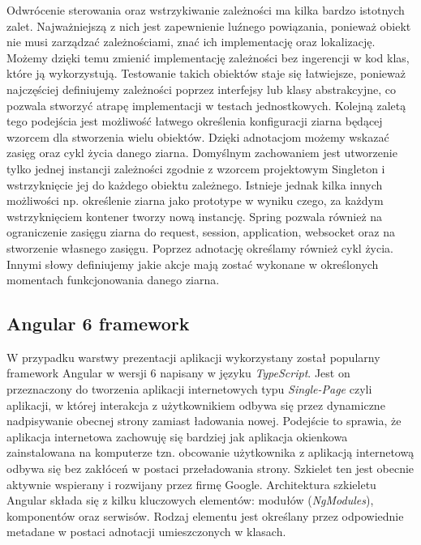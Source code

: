 Odwrócenie sterowania oraz wstrzykiwanie zależności ma kilka bardzo istotnych zalet. Najważniejszą z nich jest zapewnienie luźnego powiązania, ponieważ obiekt nie musi zarządzać zależnościami, znać ich implementację oraz lokalizację. Możemy dzięki temu zmienić implementację zależności bez ingerencji w kod klas, które ją wykorzystują. Testowanie takich obiektów staje się łatwiejsze, ponieważ najczęściej definiujemy zależności poprzez interfejsy lub klasy abstrakcyjne, co pozwala stworzyć atrapę implementacji w testach jednostkowych. Kolejną zaletą tego podejścia jest możliwość łatwego określenia konfiguracji ziarna będącej wzorcem dla stworzenia wielu obiektów. Dzięki adnotacjom możemy wskazać zasięg oraz cykl życia danego ziarna. Domyślnym zachowaniem jest utworzenie tylko jednej instancji zależności zgodnie z wzorcem projektowym Singleton i wstrzyknięcie jej do każdego obiektu zależnego. Istnieje jednak kilka innych możliwości np. określenie ziarna jako prototype w wyniku czego, za każdym wstrzyknięciem kontener tworzy nową instancję. Spring pozwala również na ograniczenie zasięgu ziarna do request, session, application, websocket oraz na stworzenie własnego zasięgu. Poprzez adnotację określamy również cykl życia. Innymi słowy definiujemy jakie akcje mają zostać wykonane w określonych momentach funkcjonowania danego ziarna.





\subsection{Angular 6 framework}
\label{subsec:angularFramework}

W przypadku warstwy prezentacji aplikacji wykorzystany został popularny framework Angular w wersji 6 napisany w języku \textit{TypeScript}. Jest on przeznaczony do tworzenia aplikacji internetowych typu \textit{Single-Page} czyli aplikacji, w której interakcja z użytkownikiem odbywa się przez dynamiczne nadpisywanie obecnej strony zamiast ładowania nowej\cite{ANG01}. Podejście to sprawia, że aplikacja internetowa zachowuję się bardziej jak aplikacja okienkowa zainstalowana na komputerze tzn. obcowanie użytkownika z aplikacją internetową odbywa się bez zakłóceń w postaci przeładowania strony. Szkielet ten jest obecnie aktywnie wspierany i rozwijany przez firmę Google. 
Architektura szkieletu Angular składa się z kilku kluczowych elementów: modułów (\textit{NgModules}), komponentów oraz serwisów. Rodzaj elementu jest określany przez odpowiednie metadane w postaci adnotacji umieszczonych w klasach.

